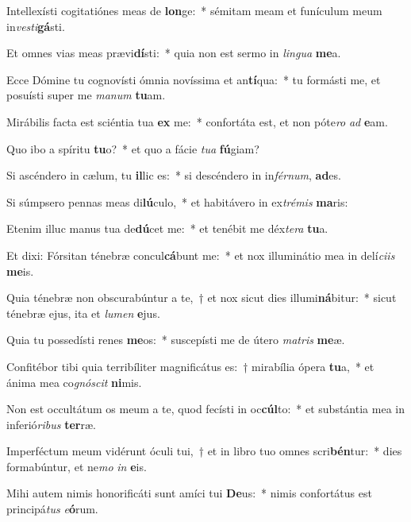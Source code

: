 \item Intellexísti cogitatiónes meas de \textbf{lon}ge:~* sémitam meam et funículum meum in\textit{vesti}\textbf{gá}sti.
\item Et omnes vias meas prævi\textbf{dí}sti:~* quia non est sermo in \textit{lingua} \textbf{me}a.
\item Ecce Dómine tu cognovísti ómnia novíssima  et an\textbf{tí}qua:~* tu formásti me, et posuísti super me \textit{manum} \textbf{tu}am.
\item Mirábilis facta est sciéntia tua \textbf{ex} me:~* confortáta est, et non póte\textit{ro} \textit{ad} \textbf{e}am.
\item Quo ibo a spíritu \textbf{tu}o?~* et quo a fácie \textit{tua} \textbf{fú}giam?
\item Si ascéndero in cælum, tu \textbf{il}lic es:~* si descéndero in in\textit{férnum}, \textbf{ad}es.
\item Si súmpsero pennas meas di\textbf{lú}culo,~* et habitávero in ex\hspace*{0.02em}\textit{trémis} \textbf{ma}ris:
\item Etenim illuc manus tua de\textbf{dú}cet me:~* et tenébit me déx\hspace*{0.02em}\textit{tera} \textbf{tu}a.
\item Et dixi: Fórsitan ténebræ concul\textbf{cá}bunt me:~* et nox illuminátio mea in delí\hspace*{0.02em}\textit{ciis} \textbf{me}is.
\item Quia ténebræ non obscurabúntur a te,~† et nox sicut dies illumi\textbf{ná}bitur:~* sicut ténebræ ejus, ita et \textit{lumen} \textbf{e}jus.
\item Quia tu possedísti renes \textbf{me}os:~* suscepísti me de útero \textit{matris} \textbf{me}æ.
\item Confitébor tibi quia terribíliter magnificátus es:~† mirabília ópera \textbf{tu}a,~* et ánima mea co\textit{gnóscit} \textbf{ni}mis.
\item Non est occultátum os meum a te, quod fecísti in oc\textbf{cúl}to:~* et substántia mea in inferió\textit{ribus} \textbf{ter}ræ.
\item Imperféctum meum vidérunt óculi tui,~† et in libro tuo o\-mnes scri\textbf{bén}tur:~* dies formabúntur, et ne\textit{mo} \textit{in} \textbf{e}is.
\item Mihi autem nimis honorificáti sunt amíci tui \textbf{De}us:~* nimis confortátus est principá\hspace*{0.02em}\textit{tus} \textit{e}\textbf{ó}rum.
